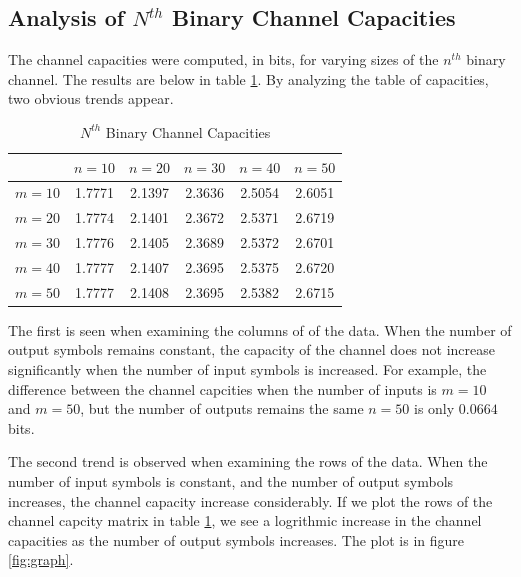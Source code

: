 \documentclass[journal]{IEEEtran}
\begin{document}
\subsection{Analysis of \(N^{th}\) Binary Channel Capacities}
\par The channel capacities were computed, in bits, for varying sizes of the \(n^{th}\) binary channel. The results are below in table \ref{tab:capacities}. By analyzing the table of capacities, two obvious trends appear.

\begin{table}[h]
\normalsize
\caption{\(N^{th}\) Binary Channel Capacities}
\label{tab:capacities}
\begin{tabular}{|c|c|c|c|c|c|}
\hline
& \(n = 10\) & \(n = 20\) & \(n = 30\) & \(n = 40\) & \(n = 50\) \\
\hline
\(m = 10\) & 1.7771  &  2.1397  &  2.3636  &  2.5054  &  2.6051 \\
\hline
\(m = 20\) & 1.7774  &  2.1401  &  2.3672  &  2.5371  &  2.6719 \\
\hline
\(m = 30\) & 1.7776  &  2.1405  &  2.3689  &  2.5372  &  2.6701 \\
\hline
\(m = 40\) & 1.7777  &  2.1407  &  2.3695  &  2.5375  &  2.6720 \\
\hline
\(m = 50\) & 1.7777  &  2.1408  &  2.3695  &  2.5382  &  2.6715 \\
\hline
\end{tabular}
\end{table}

\par The first is seen when examining the columns of  of the data. When the number of output symbols remains constant, the capacity of the channel does not increase significantly when the number of input symbols is increased. For example, the difference between the channel capcities when the number of inputs is \(m = 10\) and \(m = 50\), but the number of outputs remains the same \(n = 50\) is only \(0.0664\) bits.
\par The second trend is observed when examining the rows of the data. When the number of input symbols is constant, and the number of output symbols increases, the channel capacity increase considerably. If we plot the rows of the channel capcity matrix in table \ref{tab:capacities}, we see a logrithmic increase in the channel capacities as the number of output symbols increases. The plot is in figure \ref{fig:graph}.
\end{document}
